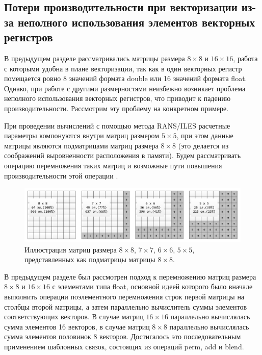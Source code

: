 \subsection{Потери производительности при векторизации из-за неполного использования элементов векторных регистров}\label{sec:text_4_spec_matr}

В предыдущем разделе рассматривались матрицы размера $8 \times 8$ и $16 \times 16$, работа с которыми удобна в плане векторизации, так как в один векторных регистр помещается ровно 8 значений формата double или 16 значений формата float.
Однако, при работе с другими размерностями неизбежно возникает проблема неполного использования векторных регистров, что приводит к падению производительности.
Рассмотрим эту проблему на конкретном примере.

При проведении вычислений с помощью метода RANS/ILES расчетные параметры компонуются внутри матриц размером $5 \times 5$, при этом данные матрицы являются подматрицами матриц размера $8 \times 8$ (это делается из соображений выровненности расположения в памяти).
Будем рассматривать операцию перемножения таких матриц и возможные пути повышения производительности этой операции \cite{Bendersky2018VecMat1}. 

\begin{figure}[ht]
\centering
\includegraphics[width=1.00\textwidth]{./pics/text_4_spec_matr/matrices.pdf}
\singlespacing
{}\caption{Иллюстрация матриц размера $8 \times 8$, $7 \times 7$, $6 \times 6$, $5 \times 5$, представленных как подматрицы матрицы $8 \times 8$.}
\label{fig:text_4_spec_matr_matrices}
\end{figure}

В предыдущем разделе был рассмотрен подход к перемножению матриц размера $8 \times 8$ и $16 \times 16$ с элементами типа float, основной идеей которого было вначале выполнить операции поэлементного перемножения строк первой матрицы на столбцы второй матрицы, а затем параллельно вычислитель суммы элементов соответствующих векторов.
В случае матриц $16 \times 16$ параллельно вычислялась сумма элементов 16 векторов, в случае матриц $8 \times 8$ параллельно вычислялась сумма элементов половинок 8 векторов.
Достигалось это последовательным применением шаблонных связок, состоящих из операций perm, add и blend.

